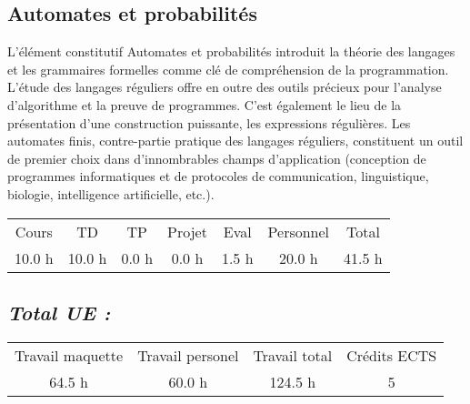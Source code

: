 \subsection{Automates et probabilités}%
\label{subsec:Automatesetprobabilits}%

%
L'élément constitutif Automates et probabilités introduit la théorie des langages et les grammaires formelles comme clé de compréhension de la programmation. L’étude des langages réguliers offre en outre des outils précieux pour l’analyse d’algorithme et la preuve de programmes. C’est également le lieu de la présentation d’une construction puissante, les expressions régulières. Les automates finis, contre{-}partie pratique des langages réguliers, constituent un outil de premier choix dans d’innombrables champs d’application (conception de programmes informatiques et de protocoles de communication, linguistique, biologie, intelligence artificielle, etc.).%
\begin{longtable}{c c c c c c c}%
\hline%
Cours&TD&TP&Projet&Eval&Personnel&Total\\%
10.0 h&10.0 h&0.0 h&0.0 h&1.5 h&20.0 h&41.5 h\\%
\hline%
\end{longtable}%
\subsection{\textit{Total UE :}}%
\label{subsec:textitTotalUE}%

%
\begin{longtable}{c c c c}%
\hline%
Travail maquette&Travail personel&Travail total&Crédits ECTS\\%
64.5 h&60.0 h&124.5 h&5\\%
\hline%
\end{longtable}